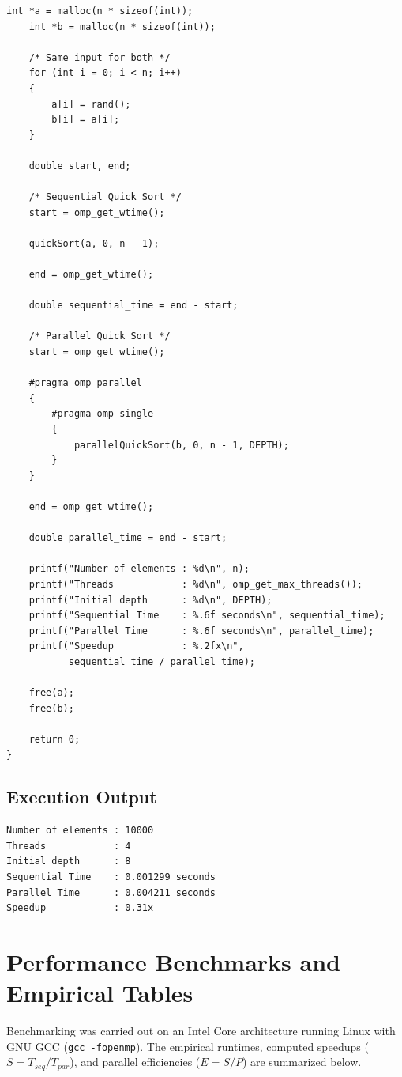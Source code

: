 \documentclass[12pt]{article}
\begin{document}
\begin{lstlisting}[style=code, caption={Complete Source Code: \texttt{quicksort\_depth.c}}]
    int *a = malloc(n * sizeof(int));
    int *b = malloc(n * sizeof(int));

    /* Same input for both */
    for (int i = 0; i < n; i++)
    {
        a[i] = rand();
        b[i] = a[i];
    }

    double start, end;

    /* Sequential Quick Sort */
    start = omp_get_wtime();

    quickSort(a, 0, n - 1);

    end = omp_get_wtime();

    double sequential_time = end - start;

    /* Parallel Quick Sort */
    start = omp_get_wtime();

    #pragma omp parallel
    {
        #pragma omp single
        {
            parallelQuickSort(b, 0, n - 1, DEPTH);
        }
    }

    end = omp_get_wtime();

    double parallel_time = end - start;

    printf("Number of elements : %d\n", n);
    printf("Threads            : %d\n", omp_get_max_threads());
    printf("Initial depth      : %d\n", DEPTH);
    printf("Sequential Time    : %.6f seconds\n", sequential_time);
    printf("Parallel Time      : %.6f seconds\n", parallel_time);
    printf("Speedup            : %.2fx\n",
           sequential_time / parallel_time);

    free(a);
    free(b);

    return 0;
}
\end{lstlisting}

\subsection{Execution Output}
\begin{lstlisting}[style=output, caption={Console Output of \texttt{quicksort\_depth.c}}]
Number of elements : 10000
Threads            : 4
Initial depth      : 8
Sequential Time    : 0.001299 seconds
Parallel Time      : 0.004211 seconds
Speedup            : 0.31x
\end{lstlisting}

\section{Performance Benchmarks and Empirical Tables}

Benchmarking was carried out on an Intel Core architecture running Linux with GNU GCC (\texttt{gcc -fopenmp}). The empirical runtimes, computed speedups ($S = T_{seq} / T_{par}$), and parallel efficiencies ($E = S / P$) are summarized below.
\end{document}
